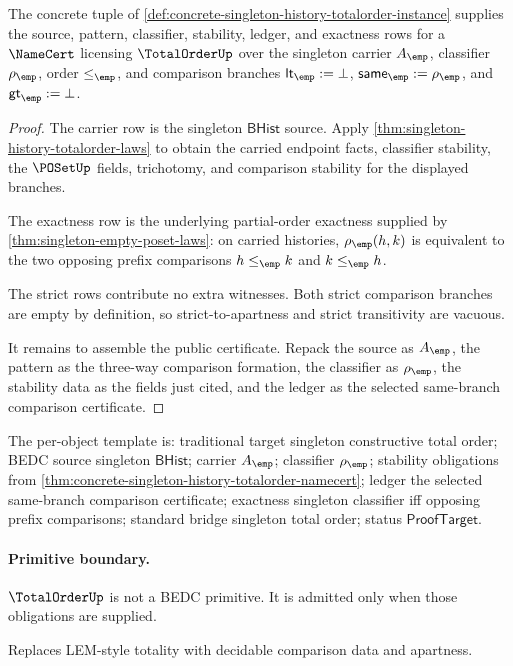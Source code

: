 \begin{theorem}
\label{thm:concrete-singleton-history-totalorder-namecert}
The concrete tuple of
\autoref{def:concrete-singleton-history-totalorder-instance} supplies the
source, pattern, classifier, stability, ledger, and exactness rows for a
$\NameCert$ licensing $\TotalOrderUp$ over the singleton carrier $A_{\emp}$,
classifier $\rho_{\emp}$, order $\le_{\emp}$, and comparison branches
$\mathsf{lt}_{\emp}:=\bot$, $\mathsf{same}_{\emp}:=\rho_{\emp}$, and
$\mathsf{gt}_{\emp}:=\bot$.
\end{theorem}
\begin{proof}
The carrier row is the singleton $\mathsf{BHist}$ source. Apply
\autoref{thm:singleton-history-totalorder-laws} to obtain the carried endpoint
facts, classifier stability, the $\POSetUp$ fields, trichotomy, and comparison
stability for the displayed branches.

The exactness row is the underlying partial-order exactness supplied by
\autoref{thm:singleton-empty-poset-laws}: on carried histories,
$\rho_{\emp}(h,k)$ is equivalent to the two opposing prefix comparisons
$h\le_{\emp}k$ and $k\le_{\emp}h$.

The strict rows contribute no extra witnesses. Both strict comparison branches
are empty by definition, so strict-to-apartness and strict transitivity are
vacuous.

It remains to assemble the public certificate. Repack the source as
$A_{\emp}$, the pattern as the three-way comparison formation, the classifier
as $\rho_{\emp}$, the stability data as the fields just cited, and the ledger
as the selected same-branch comparison certificate.
\end{proof}

The per-object template is: traditional target singleton constructive total
order; BEDC source singleton $\mathsf{BHist}$; carrier $A_{\emp}$; classifier
$\rho_{\emp}$; stability obligations from
\autoref{thm:concrete-singleton-history-totalorder-namecert}; ledger the
selected same-branch comparison certificate; exactness singleton classifier
iff opposing prefix comparisons; standard bridge singleton total order; status
$\mathsf{ProofTarget}$.

\paragraph{Primitive boundary.}
$\TotalOrderUp$ is not a BEDC primitive. It is admitted only when those obligations are supplied.

\begin{remark}
\label{rem:totalorder-zero-axiom-note}
Replaces LEM-style totality with decidable comparison data and apartness.
\end{remark}
